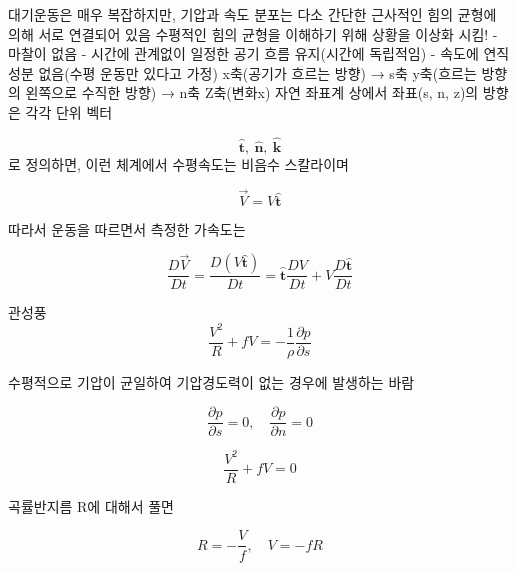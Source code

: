 %			
%        
%




                       
대기운동은 매우 복잡하지만, 기압과 속도 분포는 다소 간단한 근사적인 힘의 균형에 의해 서로 연결되어 있음
수평적인 힘의 균형을 이해하기 위해 상황을 이상화 시킴!
- 마찰이 없음
- 시간에 관계없이 일정한 공기 흐름 유지(시간에 독립적임)
- 속도에 연직 성분 없음(수평 운동만 있다고 가정)
x축(공기가 흐르는 방향) → s축
y축(흐르는 방향의 왼쪽으로 수직한 방향) →  n축
Z축(변화x)
자연 좌표계 상에서 좌표(s, n, z)의 방향은 각각 단위 벡터  

$${\displaystyle	{
		\boldsymbol{\hat{t}}, ~  \boldsymbol{\hat{n}},~
		\boldsymbol{\hat{k}}
}	}$$
로 정의하면, 이런 체계에서 수평속도는 비음수 스칼라이며

$${\displaystyle	{
		\vec{V}={V \boldsymbol{\hat{t}}}
}	}$$


따라서 운동을 따르면서 측정한 가속도는

$${\displaystyle	{
	\frac{D \vec{V}}{D t}=\frac{D(V \boldsymbol{\hat{t}})}{D t}=\boldsymbol{\hat{t}} \frac{D V}{D t}+V \frac{D \boldsymbol{\hat{t}}}{D t}
}	}$$


 
 
관성풍
$${\displaystyle {          
	\frac{V^{2}}{R}+f  V = -\frac{1}{\rho}\frac{\partial p}{\partial s} 
}}$$

수평적으로 기압이 균일하여 기압경도력이 없는 경우에 발생하는 바람

$${\displaystyle	{
	\frac{\partial p}{\partial s} = 0, \quad 
	\frac{\partial p}{\partial n} = 0
}	}$$

$${\displaystyle{
	\frac{V^{2}}{R}+f  V = 0
}	}$$

곡률반지름  R에 대해서 풀면

$${\displaystyle	{
	{R} = -\frac{V}{f}, \quad  V = -fR
}	}$$

